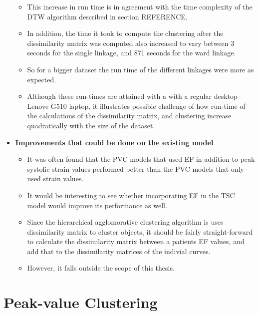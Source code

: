 \begin{itemize}
\begin{itemize}
        \item This increase in run time is in agreement with the time complexity of the DTW algorithm described in section REFERENCE.
        \item In addition, the time it took to compute the clustering after the dissimilarity matrix was computed also increased to vary between 3 seconds for the single linkage, and 871 seconds for the ward linkage.
        \item So for a bigger dataset the run time of the different linkages were more as expected. 
        \item Although these run-times are attained with a with a regular desktop Lenove G510 laptop, it illustrates possible challenge of how run-time of the calculations of the dissimilarity matrix, and clustering increase quadratically with the size of the dataset.
    \end{itemize}
    \item \textbf{Improvements that could be done on the existing model}
    \begin{itemize}
        \item It was often found that the PVC models that used EF in addition to peak systolic strain values performed better than the PVC models that only used strain values.
        \item It would be interesting to see whether incorporating EF in the TSC model would improve its performance as well.
        \item Since the hierarchical agglomorative clustering algorithm is uses dissimilarity matrix to cluster objects, 
              it should be fairly straight-forward to calculate the dissimilarity matrix between a patients EF values, and add that to the dissimilarity matrices of the indivial curves.
        \item However, it falls outside the scope of this thesis.
    \end{itemize}
\end{itemize}

\section{Peak-value Clustering}

